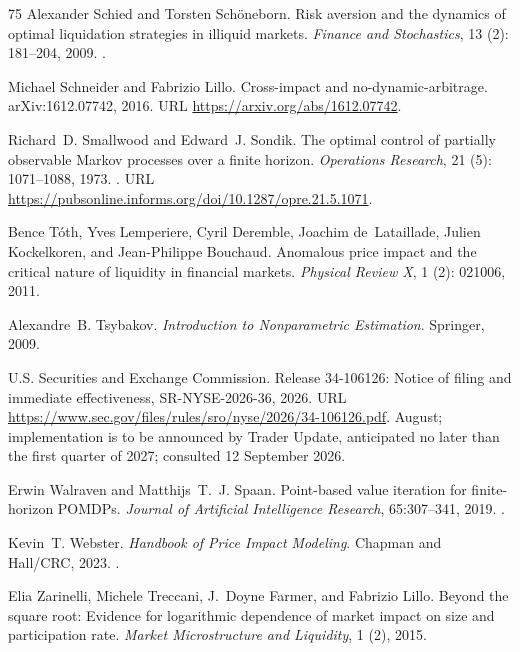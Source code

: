 \documentclass[11pt]{article}
\numberwithin{equation}{section}
\theoremstyle{definition}
\theoremstyle{remark}
\theoremstyle{definition}
\begin{document}
\begin{thebibliography}{75}
Alexander Schied and Torsten Sch{\"o}neborn.
\newblock Risk aversion and the dynamics of optimal liquidation strategies in
  illiquid markets.
\newblock \emph{Finance and Stochastics}, 13 (2): 181--204,
  2009.
\newblock {}.

Michael Schneider and Fabrizio Lillo.
\newblock Cross-impact and no-dynamic-arbitrage.
\newblock arXiv:1612.07742, 2016.
\newblock URL \url{https://arxiv.org/abs/1612.07742}.

Richard~D. Smallwood and Edward~J. Sondik.
\newblock The optimal control of partially observable {Markov} processes over a
  finite horizon.
\newblock \emph{Operations Research}, 21 (5): 1071--1088,
  1973.
\newblock {}.
\newblock URL \url{https://pubsonline.informs.org/doi/10.1287/opre.21.5.1071}.

Bence T{\'o}th, Yves Lemperiere, Cyril Deremble, Joachim de~Lataillade, Julien
  Kockelkoren, and Jean-Philippe Bouchaud.
\newblock Anomalous price impact and the critical nature of liquidity in
  financial markets.
\newblock \emph{Physical Review X}, 1 (2): 021006, 2011.

Alexandre~B. Tsybakov.
\newblock \emph{Introduction to Nonparametric Estimation}.
\newblock Springer, 2009.

{U.S. Securities and Exchange Commission}.
\newblock Release 34-106126: Notice of filing and immediate effectiveness,
  {SR-NYSE-2026-36}, 2026.
\newblock URL
  \url{https://www.sec.gov/files/rules/sro/nyse/2026/34-106126.pdf}.
 August; implementation is to be announced by Trader Update,
  anticipated no later than the first quarter of 2027; consulted 12 September
  2026.

Erwin Walraven and Matthijs~T.~J. Spaan.
\newblock Point-based value iteration for finite-horizon {POMDPs}.
\newblock \emph{Journal of Artificial Intelligence Research}, 65:307--341, 2019.
\newblock {}.

Kevin~T. Webster.
\newblock \emph{Handbook of Price Impact Modeling}.
\newblock Chapman and Hall/CRC, 2023.
\newblock {}.

Elia Zarinelli, Michele Treccani, J.~Doyne Farmer, and Fabrizio Lillo.
\newblock Beyond the square root: Evidence for logarithmic dependence of market
  impact on size and participation rate.
\newblock \emph{Market Microstructure and Liquidity}, 1 (2), 2015.

\end{thebibliography}
\end{document}
